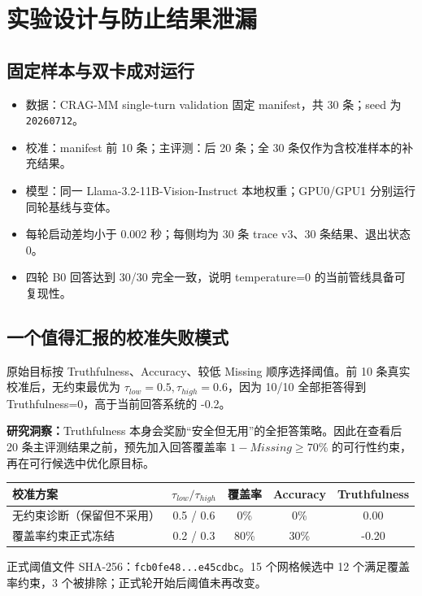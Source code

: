 \documentclass[11pt,a4paper,fontset=none]{ctexart}
\begin{document}
\section{实验设计与防止结果泄漏}
\subsection{固定样本与双卡成对运行}
\begin{itemize}
  \item 数据：CRAG-MM single-turn validation 固定 manifest，共 30 条；seed 为 \texttt{20260712}。
  \item 校准：manifest 前 10 条；主评测：后 20 条；全 30 条仅作为含校准样本的补充结果。
  \item 模型：同一 Llama-3.2-11B-Vision-Instruct 本地权重；GPU0/GPU1 分别运行同轮基线与变体。
  \item 每轮启动差均小于 0.002 秒；每侧均为 30 条 trace v3、30 条结果、退出状态 0。
  \item 四轮 B0 回答达到 30/30 完全一致，说明 temperature=0 的当前管线具备可复现性。
\end{itemize}

\subsection{一个值得汇报的校准失败模式}
原始目标按 Truthfulness、Accuracy、较低 Missing 顺序选择阈值。前 10 条真实校准后，无约束最优为 $\tau_{low}=0.5,\tau_{high}=0.6$，因为 10/10 全部拒答得到 Truthfulness=0，高于当前回答系统的 -0.2。

\begin{warnbox}
\textbf{研究洞察：}Truthfulness 本身会奖励“安全但无用”的全拒答策略。因此在查看后 20 条主评测结果之前，预先加入回答覆盖率 $1-Missing\geq70\%$ 的可行性约束，再在可行候选中优化原目标。
\end{warnbox}

\begin{tabularx}{\textwidth}{@{}YCCCC@{}}
\toprule
校准方案 & $\tau_{low}/\tau_{high}$ & 覆盖率 & Accuracy & Truthfulness \\
\midrule
无约束诊断（保留但不采用） & 0.5 / 0.6 & 0\% & 0\% & 0.00 \\
覆盖率约束正式冻结 & 0.2 / 0.3 & 80\% & 30\% & -0.20 \\
\bottomrule
\end{tabularx}

正式阈值文件 SHA-256：\texttt{fcb0fe48...e45cdbc}。15 个网格候选中 12 个满足覆盖率约束，3 个被排除；正式轮开始后阈值未再改变。
\end{document}
